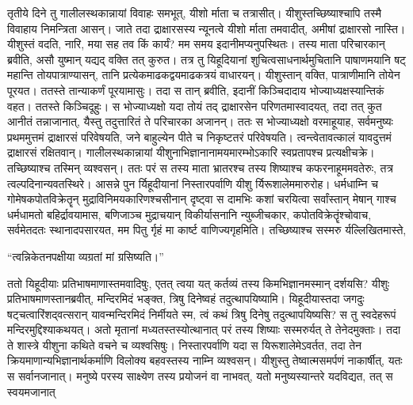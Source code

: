 \adhyAya
\vspace{25pt}
\vakya तृतीये दिने तु गालीलस्थकान्नायां विवाहः समभूत्, यीशो र्माता च तत्रासीत्।
\vakya यीशुस्तच्छिष्याश्चापि तस्मै विवाहाय निमन्त्रिता आसन्।
\vakya जाते तदा द्राक्षारसस्य न्यूनत्वे यीशो र्माता तमवादीत्, अमीषां द्राक्षारसो नास्ति।
\vakya यीशुस्तं वदति, नारि, मया सह तव किं कार्यं? मम समय इदानीमप्यनुपस्थितः।
\vakya तस्य माता परिचारकान् ब्रवीति, असौ युष्मान् यद्यद् वक्ति तत् कुरुत।
\vakya तत्र तु यिहूदियानां शुचित्वसाधनार्थमुचितानि पाषाणमयानि षट् महान्ति तोयपात्राण्यासन्, तानि प्रत्येकमाढकद्वयमाढकत्रयं वाधारयन्।
\vakya यीशुस्तान् वक्ति, पात्राणीमानि तोयेन पूरयत। ततस्ते तान्याकर्णं पूरयामासुः।
\vakya तदा स तान् ब्रवीति, इदानीं किञ्चिदादाय भोज्याध्यक्षस्यान्तिकं वहत। ततस्ते किञ्चिदूहुः।
\vakya स भोज्याध्यक्षो यदा तोयं तद् द्राक्षारसेन परिणतमास्वादयत्, तदा तत् कुत आनीतं तन्नाजानात्, यैस्तु तदुत्तारितं ते परिचारका अजानन्।
\vakya ततः स भोज्याध्यक्षो वरमाहूयाह, सर्वमनुष्यः प्रथममुत्तमं द्राक्षारसं परिवेषयति, जने बाहुल्येन पीते च निकृष्टतरं परिवेषयति। त्वन्त्वेतावत्कालं यावदुत्तमं द्राक्षारसं रक्षितवान्।
\vakya गालीलस्थकान्नायां यीशुनाभिज्ञानानामयमारम्भोऽकारि स्वप्रतापश्च प्रत्यक्षीचक्रे। तच्छिष्याश्च तस्मिन् व्यश्वसन्।
\vakya ततः परं स तस्य माता भ्रातरश्च तस्य शिष्याश्च कफरनाहूममवतेरुः, तत्र त्वल्पदिनान्यवतस्थिरे।
\vakya आसन्ने पुन र्यिहूदीयानां निस्तारपर्वाणि यीशु र्यिरूशालेममारुरोह।
\vakya धर्मधाम्नि च गोमेषकपोतविक्रेतॄन् मुद्राविनिमयकारिणश्चसीनान् दृष्ट्वा
\vakya स दामभिः कशां चरयित्वा सर्वांस्तान् मेषान् गाश्च धर्मधामतो बहिर्द्रावयामास, बणिजाञ्च मुद्राचयान् विकीर्यासनानि न्युब्जीचकार,
\vakya कपोतविक्रेतॄंश्चोवाच, सर्वमेतदतः स्थानादपसारयत, मम पितु र्गृहं मा कार्ष्ट वाणिज्यगृहमिति।
\vakya तच्छिष्याश्च सस्मरु र्यल्लिखितमास्ते,
\begin{poem}
\startwithline “त्वन्निकेतनपक्षीया व्यग्रतां मां ग्रसिष्यति।”
\end{poem}
\vakya ततो यिहूदीयाः प्रतिभाषमाणास्तमवादिषुः, एतत् त्वया यत् कर्तव्यं तस्य किमभिज्ञानमस्मान् दर्शयसि?
\vakya यीशुः प्रतिभाषमाणस्तानब्रवीत्, मन्दिरमिदं भङ्क्त, त्रिषु दिनेष्वहं तदुत्थापयिष्यामि।
\vakya यिहूदीयास्तदा जगदुः षट्चत्वारिंशद्‌वत्सरान् यावन्मन्दिरमिदं निर्मीयते स्म, त्वं कथं त्रिषु दिनेषु तदुत्थापयिष्यसि?
\vakya स तु स्वदेहरूपं मन्दिरमुद्दिश्याकथयत्।
\vakya अतो मृतानां मध्यतस्तस्योत्थानात् परं तस्य शिष्याः सस्मरुर्यत् ते तेनेदमुक्ताः। तदा ते शास्त्रे यीशुना कथिते वचने च व्यश्वसिषुः।
\vakya निस्तारपर्वाणि यदा स यिरूशालेमेऽवर्तत, तदा तेन क्रियमाणान्यभिज्ञानार्थकर्माणि विलोक्य बहवस्तस्य नाम्नि व्यश्वसन्।
\vakya यीशुस्तु तेष्वात्मसमर्पणं नाकार्षीत्, यतः स सर्वानजानात्।
\vakya मनुष्ये परस्य साक्ष्येण तस्य प्रयोजनं वा नाभवत्, यतो मनुष्यस्यान्तरे यदविद्यत, तत् स स्वयमजानात्\eoc